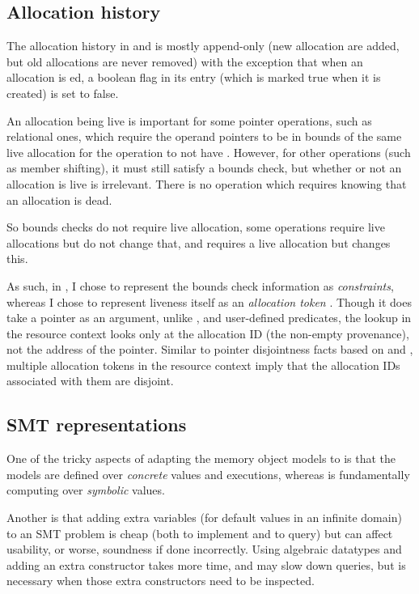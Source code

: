 \subsection{Allocation history}

The allocation history in  and  is mostly append-only
(new allocation are added, but old allocations are never removed) with the
exception that when an allocation is ed, a boolean flag in its
entry (which is marked true when it is created) is set to false.

An allocation being live is important for some pointer operations, such as
relational ones, which require the operand pointers to be in bounds of the same
live allocation for the operation to not have . However, for other
operations (such as member shifting), it must still satisfy a bounds check, but
whether or not an allocation is live is irrelevant. There is no operation which
requires knowing that an allocation is dead.

So bounds checks do not require live allocation, some operations require
live allocations but do not change that, and  requires
a live allocation but changes this.

As such, in , I chose to represent the bounds check information as
\emph{constraints}, whereas I chose to represent liveness itself as an
\emph{allocation token} . Though it does take a pointer as an
argument, unlike ,  and user-defined
predicates, the lookup in the resource context looks only at the allocation ID
(the non-empty provenance), not the address of the pointer. Similar to pointer
disjointness facts based on  and , multiple
allocation tokens in the resource context imply that the allocation IDs
associated with them are disjoint.

\subsection{SMT representations}

One of the tricky aspects of adapting the memory object models to  is
that the models are defined over \emph{concrete} values and executions, whereas
 is fundamentally computing over \emph{symbolic} values.

Another is that adding extra variables (for default values in an infinite
domain) to an SMT problem is cheap (both to implement and to query) but can
affect usability, or worse, soundness if done incorrectly. Using algebraic
datatypes and adding an extra constructor takes more time, and may slow down
queries, but is necessary when those extra constructors need to be inspected.

